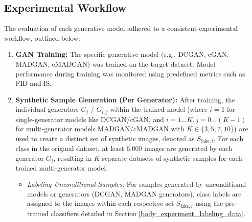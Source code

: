 \subsection{Experimental Workflow}\label{body_experiment_succession}

The evaluation of each generative model adhered to a consistent experimental workflow, outlined below:

\begin{enumerate}
    \item \textbf{GAN Training:} The specific generative model (e.g., DCGAN, cGAN, MADGAN, cMADGAN) was trained on the target dataset. Model performance during training was monitored using predefined metrics such as FID and IS.

    \item \textbf{Synthetic Sample Generation (Per Generator):} After training, the individual generators \(G_i\) / \(G_{i, j}\) within the trained model (where \(i=1\) for single-generator models like DCGAN/cGAN, and \(i=1...K, j=0...(K-1)\) for multi-generator models MADGAN/cMADGAN with \(K \in \{3, 5, 7, 10\}\)) are used to create a distinct set of synthetic images, denoted as \(S_{\text{fake}, i}\). For each class in the original dataset, at least $6.000$ images are generated by each generator \(G_i\), resulting in \(K\) separate datasets of synthetic samples for each trained multi-generator model.
        \begin{itemize}
            \item \textit{Labeling Unconditional Samples:} For samples generated by unconditional models or generators (DCGAN, MADGAN generators), class labels are assigned to the images within each respective set \(S_{\text{fake}, i}\) using the pre-trained classifiers detailed in Section \ref{body_experiment_labeling_data}.
        \end{itemize}


\end{enumerate}
